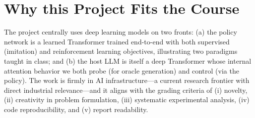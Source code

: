 \documentclass[journal]{IEEEtran}
\begin{document}
\section{Why this Project Fits the Course}
The project centrally uses deep learning models on two fronts: (a) the policy network is a learned Transformer trained end-to-end with both supervised (imitation) and reinforcement learning objectives, illustrating two paradigms taught in class; and (b) the host LLM is itself a deep Transformer whose internal attention behavior we both probe (for oracle generation) and control (via the policy). The work is firmly in AI infrastructure---a current research frontier with direct industrial relevance---and it aligns with the grading criteria of (i) novelty, (ii) creativity in problem formulation, (iii) systematic experimental analysis, (iv) code reproducibility, and (v) report readability.



\end{document}
